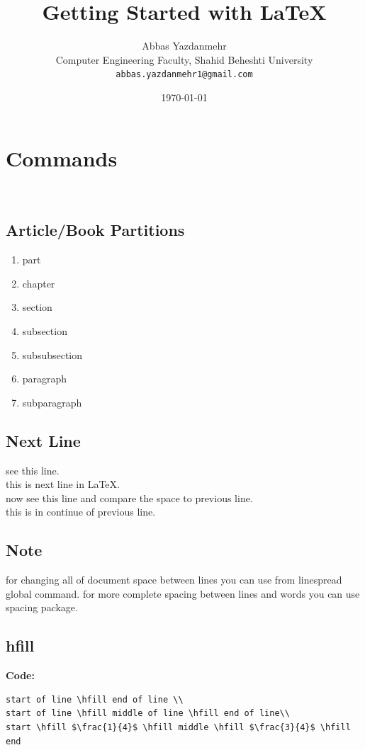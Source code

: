 \documentclass{book}
\newcommand{\myc}{\noindent\textbf{{\color{blue} Code}:}}
\begin{document}
\title{Getting Started with \LaTeX{}}
\author{
Abbas Yazdanmehr \\
Computer Engineering Faculty, Shahid Beheshti University \\
\texttt{abbas.yazdanmehr1@gmail.com}
}
\date{\today}

\maketitle

\tableofcontents


\chapter{Commands}\

\section{Article/Book Partitions}
\begin{enumerate}
  \item part
  \item chapter
  \item section
  \item subsection
  \item subsubsection
  \item paragraph
  \item subparagraph
\end{enumerate}

\section{Next Line}
see this line. \\
this is next line in \LaTeX.\\[1cm]
now see this line and compare the space to previous line. \\[2cm]
this is in continue of previous line.

\section*{Note}
for changing all of document space between lines you can use from linespread global command. for more complete spacing between lines and words you can use spacing package.\\

\section*{hfill}
\myc
\begin{lstlisting}
start of line \hfill end of line \\
start of line \hfill middle of line \hfill end of line\\
start \hfill $\frac{1}{4}$ \hfill middle \hfill $\frac{3}{4}$ \hfill end
\end{lstlisting}
\end{document}
